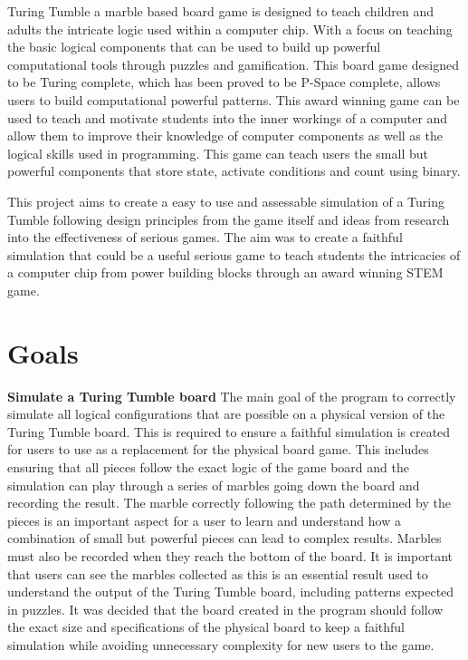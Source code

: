 \documentclass{l4proj}
\begin{document}
Turing Tumble a marble based board game is designed to teach children and adults the intricate logic used within a computer chip. With a focus on teaching the basic logical components that can be used to build up powerful computational tools through puzzles and gamification. This board game designed to be Turing complete, which has been proved to be P-Space complete, allows users to build computational powerful patterns. This award winning game can be used to teach and motivate students into the inner workings of a computer and allow them to improve their knowledge of computer components as well as the logical skills used in programming. This game can teach users the small but powerful components that store state, activate conditions and count using binary. 

This project aims to create a easy to use and assessable simulation of a Turing Tumble following design principles from the game itself and ideas from research into the effectiveness of serious games. The aim was to create a faithful simulation that could be a useful serious game to teach students the intricacies of a computer chip from power building blocks through an award winning STEM game.


\section{Goals}
\textbf{Simulate a Turing Tumble board} The main goal of the program to correctly simulate all logical configurations that are possible on a physical version of the Turing Tumble board. This is required to ensure a faithful simulation is created for users to use as a replacement for the physical board game. This includes ensuring that all pieces follow the exact logic of the game board and the simulation can play through a series of marbles going down the board and recording the result. The marble correctly following the path determined by the pieces is an important aspect for a user to learn and understand how a combination of small but powerful pieces can lead to complex results. Marbles must also be recorded when they reach the bottom of the board. It is important that users can see the marbles collected as this is an essential result used to understand the output of the Turing Tumble board, including patterns expected in puzzles. It was decided that the board created in the program should follow the exact size and specifications of the physical board to keep a faithful simulation while avoiding unnecessary complexity for new users to the game.
\end{document}
